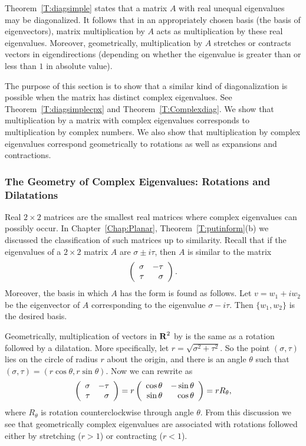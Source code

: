 Theorem~\ref{T:diagsimple} states that a matrix $A$ with real
unequal eigenvalues may be diagonalized. It follows that 
in an appropriately chosen basis (the basis of eigenvectors), 
matrix multiplication by $A$ acts 
as multiplication by these real eigenvalues.  Moreover, geometrically, 
multiplication by $A$ stretches or contracts vectors in 
eigendirections (depending on whether the eigenvalue is greater
than or less than $1$ in absolute value).

The purpose of this section is to show that a similar kind of diagonalization 
is possible when the matrix has distinct complex eigenvalues. See
Theorem~\ref{T:diagsimplecpx} and Theorem~\ref{T:Complexdiag}.  We show 
that multiplication by a matrix with complex eigenvalues corresponds
to multiplication by complex numbers.  We also show that multiplication by 
complex eigenvalues correspond geometrically to rotations 
as well as expansions and contractions.

\subsubsection*{The Geometry of Complex Eigenvalues: Rotations and
Dilatations}

Real $2\times 2$ matrices are the smallest real matrices where complex 
eigenvalues can possibly occur.  In Chapter~\ref{Chap:Planar}, 
Theorem~\ref{T:putinform}(b) we discussed the classification of such matrices 
up to similarity.  Recall that if the eigenvalues of a $2\times 2$ matrix $A$ 
are $\sigma\pm i\tau$, 
then $A$ is similar to the matrix 
\begin{equation} \label{E:normalfm2}
\left(\begin{array}{rr} \sigma & -\tau\\ \tau &\sigma\end{array}\right).
\end{equation}
Moreover, the basis in which $A$ has the form  is found
as follows.  Let $v=w_1+iw_2$ be the eigenvector of $A$ corresponding to 
the eigenvalue $\sigma-i\tau$.  Then $\{w_1,w_2\}$ is the desired 
basis.

Geometrically, multiplication of vectors in $\mbox{$\bf{R}$}^2$ by  is 
the same as a rotation followed by a dilatation.  More 
specifically, let $r=\sqrt{\sigma^2+\tau^2}$.  So the point $(\sigma,\tau)$ 
lies on the circle of radius $r$ about the origin, and there is an angle 
$\theta$ such that $(\sigma,\tau)=(r\cos\theta,r\sin\theta)$.  Now we can 
rewrite  as
\[
\left(\begin{array}{rr} \sigma & -\tau\\ \tau &\sigma\end{array}\right)
= r\left(\begin{array}{rr} \cos\theta & -\sin{\theta}\\ \sin\theta &\cos\theta\end{array}\right)=rR_{\theta},
\]
where $R_\theta$ is rotation counterclockwise through angle $\theta$.  From 
this discussion we see that geometrically complex eigenvalues are associated 
with rotations followed either by stretching ($r>1$) or contracting ($r<1$).

